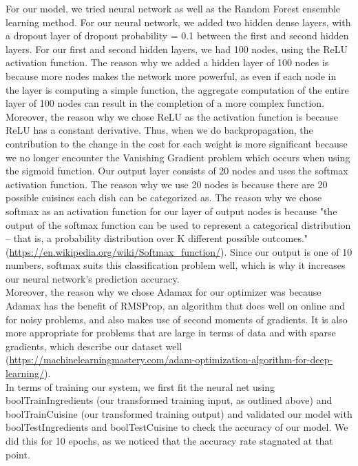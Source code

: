 \documentclass[11pt]{article}
\begin{document}
For our model, we tried neural network as well as the Random Forest ensemble learning
method. For our neural network, we added two hidden dense layers, with a
dropout layer of dropout probability = 0.1 between the first and second hidden
layers. For our first and second hidden layers, we had 100 nodes, using the ReLU
activation function. The reason why we added a hidden layer of 100 nodes
is because more nodes makes the network more powerful, as even if
each node in the layer is computing a simple function, the aggregate computation
of the entire layer of 100 nodes can result in the completion of a more
complex function. Moreover, the reason why we chose ReLU as the activation function is because
ReLU has a constant derivative. Thus, when we do backpropagation, the contribution
to the change in the cost for each weight is more significant because
we no longer encounter the Vanishing Gradient problem which occurs when using the
sigmoid function. Our output layer consists of 20 nodes and uses the softmax
activation function. The reason why we use 20 nodes is because there are 20
possible cuisines each dish can be categorized as. The reason why we chose softmax as an activation function for our layer of
output nodes is because "the output of the softmax function can be used to
represent a categorical distribution – that is, a probability distribution
over K different possible outcomes." (\url{https://en.wikipedia.org/wiki/Softmax_function/}).
Since our output is one of 10 numbers, softmax suits this classification problem
well, which is why it increases our neural network's prediction accuracy. \\

Moreover, the reason why we chose Adamax for our optimizer was because Adamax has the benefit of RMSProp,
an algorithm that does well on online and for noisy problems, and also makes
use of second moments of gradients. It is also more appropriate for problems
that are large in terms of data and with sparse gradients, which describe our
dataset well (\url{https://machinelearningmastery.com/adam-optimization-algorithm-for-deep-learning/}). \\



In terms of training our system, we first fit the neural net using boolTrainIngredients
(our transformed training input, as outlined above) and boolTrainCuisine (our
transformed training output) and validated our model with boolTestIngredients and boolTestCuisine
to check the accuracy of our model. We did this for 10 epochs, as we noticed that
the accuracy rate stagnated at that point. \\
\end{document}
